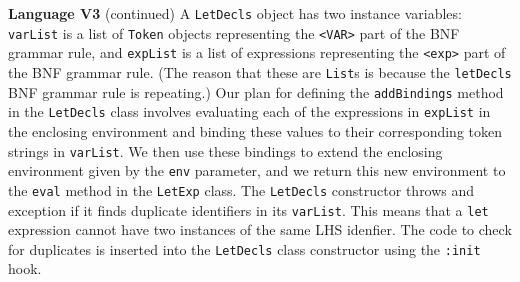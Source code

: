 \begin{minipage}[t]{\sw}
\slidenumber
\LARGE
{\bf Language V3} (continued)\exx
{\Large
\emm{}%
}\exx
A \verb'LetDecls' object
has two instance variables:
\verb'varList' is a list of \verb'Token' objects
representing the \verb'<VAR>' part of the BNF grammar rule,
and \verb'expList' is a list of expressions
representing the \verb'<exp>' part of the BNF grammar rule.
(The reason that these are \verb'List's is because
the \verb'letDecls' BNF grammar rule is repeating.)
Our plan for defining the \verb'addBindings' method
in the \verb'LetDecls' class
involves evaluating each of the expressions in \verb'expList'
in the enclosing environment and binding these values
to their corresponding token strings in \verb'varList'.
We then use these bindings to extend the enclosing environment
given by the \verb'env' parameter,
and we return this new environment to the \verb'eval' method
in the \verb'LetExp' class.\exx
The \verb'LetDecls' constructor throws and exception
if it finds duplicate identifiers in its \verb'varList'.
This means that a \verb'let' expression cannot have
two instances of the same LHS idenfier.
The code to check for duplicates is inserted
into the \verb'LetDecls' class constructor
using the \verb':init' hook.
\end{minipage}
\clearpage
